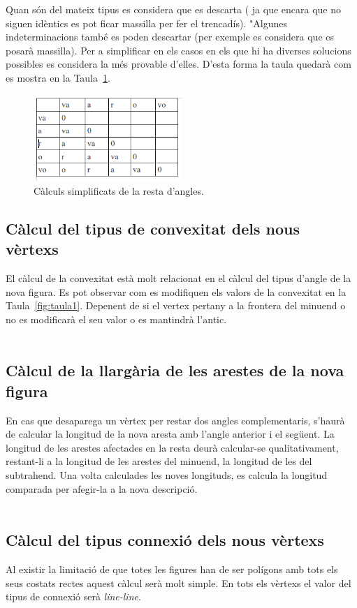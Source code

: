 \documentclass{article}
\begin{document}
Quan són del mateix tipus es considera que es descarta ( ja que encara que no siguen idèntics es pot ficar massilla per fer el trencadís).
"Algunes indeterminacions també es poden descartar (per exemple es 
considera que es posarà massilla).
Per a simplificar en els casos en els que hi ha diverses solucions possibles es considera la més provable d'elles.
D'esta forma la taula quedarà com es mostra en la Taula~\ref{fig:taula3}.

\begin{figure}[h]
\centering
\includegraphics[width=160pt]{images/taula3.png}
\caption {Càlculs simplificats de la resta d'angles.}
\label {fig:taula3}
\end{figure}


\subsection{Càlcul del tipus de convexitat dels nous vèrtexs}
El càlcul de la convexitat està molt relacionat en el càlcul del tipus d'angle de la nova figura.
Es pot observar com es modifiquen els valors de la convexitat en la Taula~\ref{fig:taula1}.
Depenent de si el vertex pertany a la frontera del minuend o no es modificarà el seu valor o es mantindrà l'antic.
\\
\\
\subsection{Càlcul de la llargària de les arestes de la nova figura}
En cas que desaparega un vèrtex per restar dos angles complementaris, s'haurà de calcular la longitud de la nova aresta amb l'angle anterior i el següent.
La longitud de les arestes afectades en la resta deurà calcular-se qualitativament, restant-li a la longitud de les arestes del minuend, la longitud de les del subtrahend.
Una volta calculades les noves longituds, es calcula la longitud comparada per afegir-la a la nova descripció.
\\
\\
\subsection{Càlcul del tipus connexió dels nous vèrtexs}
Al existir la limitació de que totes les figures han de ser polígons amb tots els seus costats rectes aquest càlcul serà molt simple.
En tots els vèrtexs el valor del tipus de connexió serà \emph{line-line}. 
\\
\\
\end{document}
